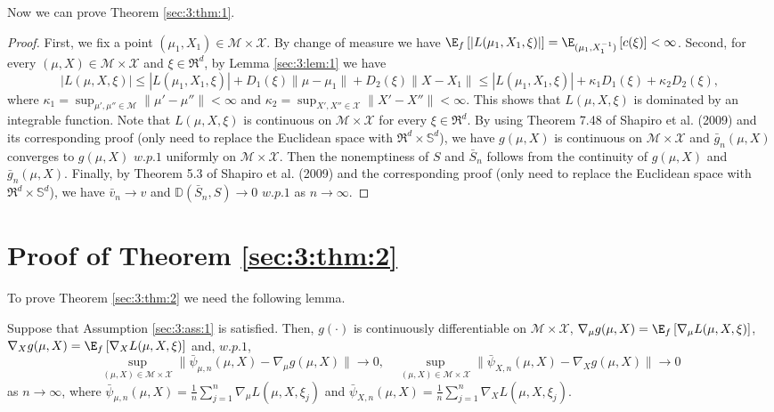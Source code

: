 Now we can prove Theorem \ref{sec:3:thm:1}.
\begin{proof}
First, we fix a point $(\mu_1,X_1)\in\mathcal{M}\times\mathcal {X}$.
By change of measure we have
$\E_f\left[|L(\mu_1,X_1,\xi)|\right]=\E_{(\mu_1,X_1^{-1})}
\left[c(\xi)\right]<\infty$. Second, for every
$(\mu,X)\in\mathcal{M}\times\mathcal {X}$ and $\xi\in \Re^d$, by
Lemma \ref{sec:3:lem:1} we have
\[
|L(\mu,X,\xi)|\le |L(\mu_1,X_1,\xi)|+
D_1(\xi)\|\mu-\mu_1\|+D_2(\xi)\|X-X_1\|\le |L(\mu_1,X_1,\xi)|+
\kappa_1D_1(\xi)+\kappa_2D_2(\xi),
\]
where $\kappa_1=\sup_{\mu',\mu''\in
\mathcal{M}}\|\mu'-\mu''\|<\infty$ and $\kappa_2=\sup_{X',X''\in
\mathcal{X}}\|X'-X''\|<\infty$. This shows that $L(\mu,X,\xi)$ is
dominated by an integrable function. Note that $L(\mu,X,\xi)$ is
continuous on $\mathcal{M}\times\mathcal {X}$ for every $\xi\in
\Re^d$. By using Theorem 7.48 of Shapiro et al. (2009) and its
corresponding proof (only need to replace the Euclidean space with
$\Re^d\times \mathbb S^d$), we have $g(\mu,X)$ is continuous on
$\mathcal{M}\times\mathcal {X}$ and $\bar g_n(\mu,X)$ converges to
$g(\mu,X)$ $w.p.1$ uniformly on $\mathcal{M}\times\mathcal {X}$.
Then the nonemptiness of $S$ and $\bar S_n$ follows from the
continuity of $g(\mu,X)$ and $\bar g_n(\mu,X)$. Finally, by Theorem
5.3 of Shapiro et al. (2009) and the corresponding proof (only need
to replace the Euclidean space with $\Re^d\times \mathbb S^d$), we
have $\bar v_n\to v$ and $\mathbb{D}(\bar S_n,S)\to 0$ $w.p.1$ as
$n\to \infty$.
\end{proof}


\section{Proof of Theorem \ref{sec:3:thm:2}}

To prove Theorem \ref{sec:3:thm:2} we need the following lemma.

\begin{lemma}\label{sec:3:lem:2}
Suppose that Assumption \ref{sec:3:ass:1} is satisfied.  Then,
$g(\cdot)$ is continuously differentiable on
$\mathcal{M}\times\mathcal{X}$, $\nabla_{\mu}
g(\mu,X)=\E_f\left[\nabla_{\mu} L(\mu,X,\xi)\right]$, $\nabla_X
g(\mu,X)=\E_f\left[\nabla_X L(\mu,X,\xi)\right]$ and, $w.p.1$,
\begin{equation*}
\sup_{(\mu,X)\in\mathcal{M}\times\mathcal {X}}\|\bar
\psi_{\mu,n}(\mu,X)-\nabla_{\mu} g(\mu,X)\|\to 0, \quad
\sup_{(\mu,X)\in\mathcal{M}\times\mathcal {X}}\|\bar
\psi_{X,n}(\mu,X)-\nabla_X g(\mu,X)\|\to 0
\end{equation*}
as $n\to\infty$, where
$\bar\psi_{\mu,n}(\mu,X)=\frac{1}{n}\sum_{j=1}^n\nabla_{\mu}
L(\mu,X,\xi_j)$ and
$\bar\psi_{X,n}(\mu,X)=\frac{1}{n}\sum_{j=1}^n\nabla_X
L(\mu,X,\xi_j)$.
\end{lemma}

